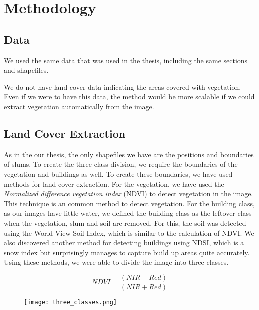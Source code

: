 \section{Methodology}


\subsection{Data}
We used the same data that was used in the thesis, including the same sections and shapefiles. 

We do not have land cover data indicating the areas covered with vegetation. Even if we were to have this data, the method would be more scalable if we could extract vegetation automatically from the image. 

\subsection{Land Cover Extraction}
As in the our thesis, the only shapefiles we have are the positions and boundaries of slums. To create the three class division, we require the boundaries of the vegetation and buildings as well. To create these boundaries, we have used methods for land cover extraction. For the vegetation, we have used the \textit{Normalized difference vegetation index} (NDVI) to detect vegetation in the image. This technique is an common method to detect vegetation. For the building class, as our images have little water, we defined the building class as the leftover class when the vegetation, slum and soil are removed. For this, the soil was detected using the World View Soil Index, which is similar to the calculation of NDVI. We also discovered another method for detecting buildings using NDSI, which is a snow index but surprisingly manages to capture build up areas quite accurately. Using these methods, we were able to divide the image into three classes.

\begin{equation}
NDVI = \frac{(NIR-Red)}{(NIR+Red)}
\end{equation}

\begin{figure}
	\centering
	\texttt{[image: three\_classes.png]}
\end{figure}



